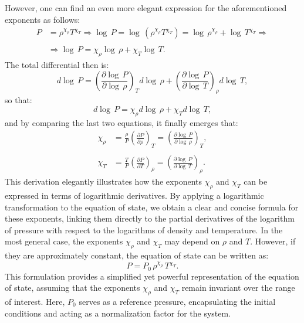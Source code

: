 \documentclass[main.tex]{subfiles}
\begin{document}
However, one can find an even more elegant expression for the aforementioned exponents as follows:
\begin{align*}
     P &= \rho^{\chi_\rho} T^{\chi_T} \Rightarrow \log \,P = \log \,\left( \rho^{\chi_\rho} T^{\chi_T} \right) = \log \,\rho^{\chi_\rho} + \log \,T^{\chi_T} \Rightarrow \\\\
     &\Rightarrow \log \,P = \chi_\rho \log \,\rho + \chi_T \log \,T.
\end{align*}
The total differential then is:
\begin{equation*}
    d\log \,P = \left( \frac{\partial \log \,P}{\partial \log \,\rho} \right)_T d \log \,\rho + \left( \frac{\partial \log \,P}{\partial \log \,T} \right)_\rho d \log \,T,
\end{equation*}
so that:
\begin{equation*}
    d \log \,P = \chi_\rho d\log \,\rho + \chi_T d \log \,T,
\end{equation*}
and by comparing the last two equations, it finally emerges that:
\begin{align}
    \chi_\rho &= \frac{\rho}{P} \left( \frac{\partial P}{\partial \rho} \right)_T = \left( \frac{\partial \log \,P}{\partial \log \,\rho} \right)_T, \label{apx:eq:chi_rho}\\\nonumber\\
    \chi_T &= \frac{T}{P} \left( \frac{\partial P}{\partial T} \right)_\rho = \left( \frac{\partial \log \,P}{\partial \log \,T} \right)_\rho. \label{apx:eq:chi_T}
\end{align}
This derivation elegantly illustrates how the exponents $\chi_\rho$ and $\chi_T$ can be expressed in terms of logarithmic derivatives. By applying a logarithmic transformation to the equation of state, we obtain a clear and concise formula for these exponents, linking them directly to the partial derivatives of the logarithm of pressure with respect to the logarithms of density and temperature. 
In the most general case, the exponents $\chi_\rho$ and $\chi_T$ may depend on $\rho$ and $T$. However, if they are approximately constant, the equation of state can be written as:
\begin{equation}
    \label{apx:eq:eos_chi_rho_chi_T}
    P = P_0 \,\rho^{\chi_\rho} \,T^{\chi_T}.
\end{equation}
This formulation provides a simplified yet powerful representation of the equation of state, assuming that the exponents $\chi_\rho$ and $\chi_T$ remain invariant over the range of interest. Here, $P_0$ serves as a reference pressure, encapsulating the initial conditions and acting as a normalization factor for the system.
\end{document}
